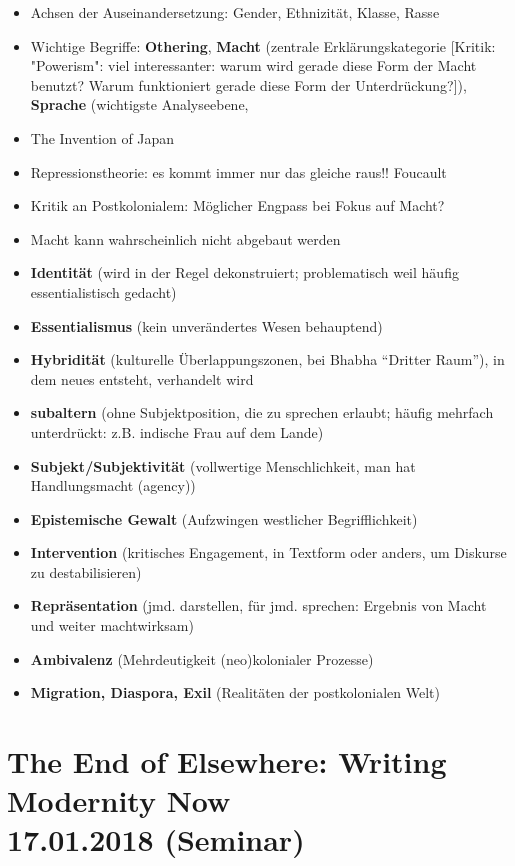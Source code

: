 \documentclass[emulatestandardclasses]{scrartcl}
\begin{document}
\begin{itemize}
  \item Achsen der Auseinandersetzung: Gender, Ethnizität, Klasse, Rasse
  \item Wichtige Begriffe: \textbf{Othering}, \textbf{Macht} (zentrale Erklärungskategorie [Kritik: "Powerism": viel interessanter: warum wird gerade diese Form der Macht benutzt? Warum funktioniert gerade diese Form der Unterdrückung?]), \textbf{Sprache} (wichtigste Analyseebene, 
  \item The Invention of Japan
  \item Repressionstheorie: es kommt immer nur das gleiche raus!! Foucault
  \item Kritik an Postkolonialem: Möglicher Engpass bei Fokus auf Macht?
  \item Macht kann wahrscheinlich nicht abgebaut werden
  \item \textbf{Identität} (wird in der Regel dekonstruiert; problematisch weil häufig essentialistisch gedacht)
  \item \textbf{Essentialismus} (kein unverändertes Wesen behauptend)
  \item \textbf{Hybridität} (kulturelle Überlappungszonen, bei Bhabha "`Dritter Raum"'), in dem neues entsteht, verhandelt wird
  \item \textbf{subaltern} (ohne Subjektposition, die zu sprechen erlaubt; häufig mehrfach unterdrückt: z.B. indische Frau auf dem Lande)
  \item \textbf{Subjekt/Subjektivität} (vollwertige Menschlichkeit, man hat Handlungsmacht (agency))
  \item \textbf{Epistemische Gewalt} (Aufzwingen westlicher Begrifflichkeit)
  \item \textbf{Intervention} (kritisches Engagement, in Textform oder anders, um Diskurse zu destabilisieren)
  \item \textbf{Repräsentation} (jmd. darstellen, für jmd. sprechen: Ergebnis von Macht und weiter machtwirksam)
  \item \textbf{Ambivalenz} (Mehrdeutigkeit (neo)kolonialer Prozesse)
  \item \textbf{Migration, Diaspora, Exil} (Realitäten der postkolonialen Welt)
\end{itemize}


\section{The End of Elsewhere: Writing Modernity Now\\17.01.2018 (Seminar)}
\end{document}
